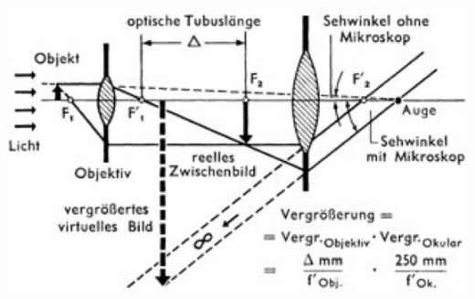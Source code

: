 \documentclass[12pt,a4paper]{article}
\renewcommand{\=}[1]{\stackrel{#1}{=}}
\theoremstyle{definition}
\theoremstyle{remark}
\begin{document}
\begin{center}
\begin{minipage}[t]{.58\linewidth}
\end{minipage}%
\begin{minipage}[t]{.4\linewidth}
\vspace{0pt}
\includegraphics[width=\linewidth]{pic/mikroskop.jpg}

\end{minipage}
\end{center}
\end{document}
